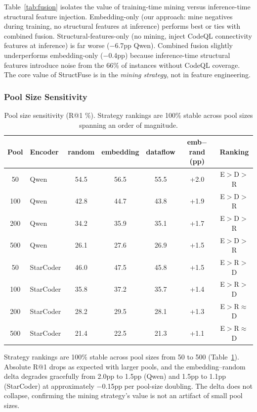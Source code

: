 \documentclass[11pt]{article}
\begin{document}
Table~\ref{tab:fusion} isolates the value of training-time mining versus inference-time structural feature injection.
Embedding-only (our approach: mine negatives during training, no structural features at inference) performs best or ties with combined fusion.
Structural-features-only (no mining, inject CodeQL connectivity features at inference) is far worse ($-$6.7pp Qwen).
Combined fusion slightly underperforms embedding-only ($-$0.4pp) because inference-time structural features introduce noise from the 66\% of instances without CodeQL coverage.
The core value of StructFuse is in the \emph{mining strategy}, not in feature engineering.

\subsubsection{Pool Size Sensitivity}
\label{sec:pool_sensitivity}

\begin{table}[h]
\centering
\caption{Pool size sensitivity (R@1 \%). Strategy rankings are 100\% stable across pool sizes spanning an order of magnitude.}
\label{tab:pool_size}
\begin{tabular}{clccccc}
\toprule
\textbf{Pool} & \textbf{Encoder} & \textbf{random} & \textbf{embedding} & \textbf{dataflow} & \textbf{emb$-$rand (pp)} & \textbf{Ranking} \\
\midrule
50 & Qwen & 54.5 & 56.5 & 55.5 & +2.0 & E$>$D$>$R \\
100 & Qwen & 42.8 & 44.7 & 43.8 & +1.9 & E$>$D$>$R \\
200 & Qwen & 34.2 & 35.9 & 35.1 & +1.7 & E$>$D$>$R \\
500 & Qwen & 26.1 & 27.6 & 26.9 & +1.5 & E$>$D$>$R \\
\midrule
50 & StarCoder & 46.0 & 47.5 & 45.8 & +1.5 & E$>$R$>$D \\
100 & StarCoder & 35.8 & 37.2 & 35.7 & +1.4 & E$>$R$>$D \\
200 & StarCoder & 28.2 & 29.5 & 28.1 & +1.3 & E$>$R$\approx$D \\
500 & StarCoder & 21.4 & 22.5 & 21.3 & +1.1 & E$>$R$\approx$D \\
\bottomrule
\end{tabular}
\end{table}

Strategy rankings are 100\% stable across pool sizes from 50 to 500 (Table~\ref{tab:pool_size}).
Absolute R@1 drops as expected with larger pools, and the embedding--random delta degrades gracefully from 2.0pp to 1.5pp (Qwen) and 1.5pp to 1.1pp (StarCoder) at approximately $-$0.15pp per pool-size doubling.
The delta does not collapse, confirming the mining strategy's value is not an artifact of small pool sizes.
\end{document}
